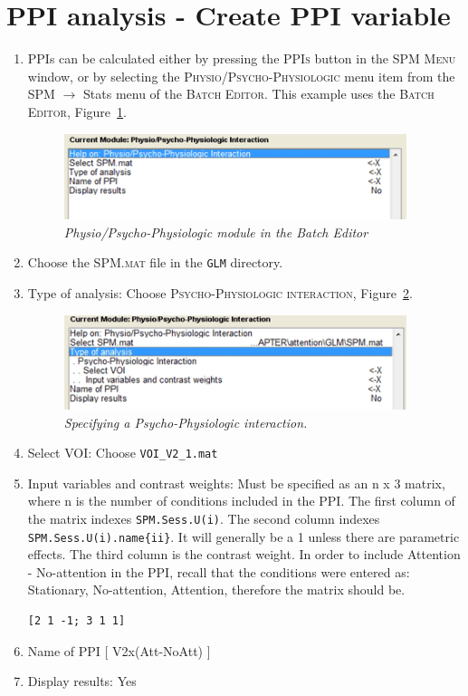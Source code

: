 \section{PPI analysis - Create PPI variable\label{create_ppi}}
\begin{enumerate}
\item PPIs can be calculated either by pressing the \textsc{PPIs} button in the \textsc{SPM Menu} window, or by selecting the \textsc{Physio/Psycho-Physiologic} menu item from the SPM $\rightarrow$ Stats menu of the \textsc{Batch Editor}. This example uses the \textsc{Batch Editor}, Figure~\ref{fig:ppi11}.

\begin{figure}[!ht]
\centering\includegraphics[width=100mm]{ppi/figures/Fig11.png}
\caption{\em Physio/Psycho-Physiologic module in the Batch Editor}
\label{fig:ppi11}
\end{figure}

\item Choose the \textsc{SPM.mat} file in the \texttt{GLM} directory.
\item Type of analysis: Choose \textsc{Psycho-Physiologic interaction}, Figure~\ref{fig:ppi12}.

\begin{figure}[!ht]
\centering\includegraphics[width=100mm]{ppi/figures/Fig12.png}
\caption{\em Specifying a Psycho-Physiologic interaction.}
\label{fig:ppi12}
\end{figure}

\item Select VOI: Choose \texttt{VOI\_V2\_1.mat}
\item Input variables and contrast weights: Must be specified as an n x 3 matrix, where n is the number of conditions included in the PPI. The first column of the matrix indexes \texttt{SPM.Sess.U(i)}. The second column indexes \texttt{SPM.Sess.U(i).name\{ii\}}. It will generally be a 1 unless there are parametric effects. The third column is the contrast weight. In order to include Attention - No-attention in the PPI, recall that the conditions were entered as: Stationary, No-attention, Attention, therefore the matrix should be.
\begin{verbatim}
[2 1 -1; 3 1 1]
\end{verbatim}
\item Name of PPI [ V2x(Att-NoAtt) ]
\item Display results: Yes
\end{enumerate}

